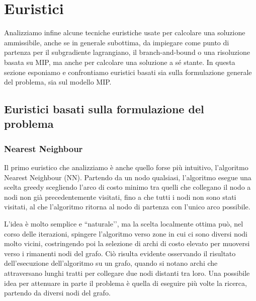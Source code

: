 \chapter{Euristici}\label{sec:capheur}
Analizziamo infine alcune tecniche euristiche usate per calcolare una soluzione ammissibile, anche se in generale subottima, da impiegare come punto di partenza per il subgradiente lagrangiano, il branch-and-bound o una risoluzione basata su MIP, ma anche per calcolare una soluzione a sé stante. In questa sezione esponiamo e confrontiamo euristici basati sia sulla formulazione generale del problema, sia sul modello MIP.

\section{Euristici basati sulla formulazione del problema}
\subsection{Nearest Neighbour}
Il primo euristico che analizziamo è anche quello forse più intuitivo, l’algoritmo Nearest Neighbour (NN). Partendo da un nodo qualsiasi, l’algoritmo esegue una scelta greedy scegliendo l’arco di costo minimo tra quelli che collegano il nodo a nodi non già precedentemente visitati, fino a che tutti i nodi non sono stati visitati, al che l’algoritmo ritorna al nodo di partenza con l’unico arco possibile.

L’idea è molto semplice e ``naturale’’, ma la scelta localmente ottima può, nel corso delle iterazioni, spingere l’algoritmo verso zone in cui ci sono diversi nodi molto vicini, costringendo poi la selezione di archi di costo elevato per muoversi verso i rimanenti nodi del grafo. Ciò risulta evidente osservando il risultato dell’esecuzione dell’algoritmo su un grafo, quando si notano archi che attraversano lunghi tratti per collegare due nodi distanti tra loro. Una possibile idea per attenuare in parte il problema è quella di eseguire più volte la ricerca, partendo da diversi nodi del grafo.


